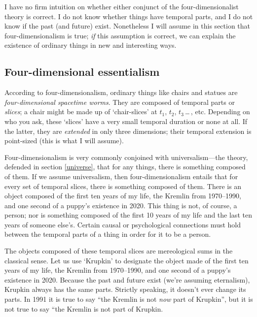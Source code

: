 \documentclass[11pt]{article}
\begin{document}
\begin{spacing}{1.5}
I have no firm intuition on whether either conjunct of the
four-dimensionalist theory is correct.  I do not know whether things
have temporal parts, and I do not know if the past (and future) exist.
Nonetheless I will assume in this section that four-dimensionalism is
true; {\em if} this assumption is correct, we can explain the
existence of ordinary things in new and interesting ways.

\subsection{Four-dimensional essentialism}
\label{4de}
According to four-dimensionalism, ordinary things like chairs and
statues are {\em four-dimensional spacetime worms}.  They are composed
of temporal parts or {\em slices}; a chair might be made up of
`chair-slices' at $t_{1}$, $t_{2}$, $t_{3}$\,\ldots\,, etc.  Depending
on who you ask, these `slices' have a very small temporal duration or
none at all.  If the latter, they are {\em extended} in only three
dimensions; their temporal extension is point-sized (this is what I
will assume).

Four-dimensionalism is very commonly conjoined with universalism---the
theory, defended in section \ref{universe}, that for any things, there
is something composed of them.  If we assume universalism, then
four-dimensionalism entails that for every set of temporal slices,
there is something composed of them.  There is an object composed of
the first ten years of my life, the Kremlin from 1970--1990, and one
second of a puppy's existence in 2020.  This thing is not, of course,
a person; nor is something composed of the first 10 years of my life
and the last ten years of someone else's.  Certain causal or
psychological connections must hold between the temporal parts of a
thing in order for it to be a person.

The objects composed of these temporal slices are mereological sums in
the classical sense.  Let us use `Krupkin' to designate the object
made of the first ten years of my life, the Kremlin from 1970--1990,
and one second of a puppy's existence in 2020.  Because the past and
future exist (we're assuming eternalism), Krupkin always has the same
parts.  Strictly speaking, it doesn't ever change its parts.  In 1991
it is true to say ``the Kremlin is not {\em now} part of Krupkin'',
but it is not true to say ``the Kremlin is not part of Krupkin.


\end{spacing}
\end{document}
